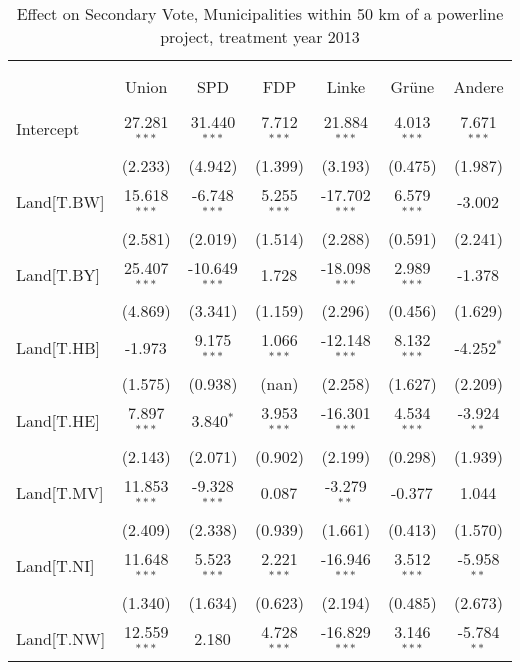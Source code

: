 \begin{table}[!htbp] \centering
  \caption{Effect on Secondary Vote, Municipalities within 50 km of a powerline project, treatment year 2013}
\begin{tabular}{@{\extracolsep{5pt}}lcccccc}
\\[-1.8ex]\hline
\hline \\[-1.8ex]
\\[-1.8ex] & \multicolumn{1}{c}{Union} & \multicolumn{1}{c}{SPD} & \multicolumn{1}{c}{FDP} & \multicolumn{1}{c}{Linke} & \multicolumn{1}{c}{Grüne} & \multicolumn{1}{c}{Andere}  \\
\hline \\[-1.8ex]
 Intercept & 27.281$^{***}$ & 31.440$^{***}$ & 7.712$^{***}$ & 21.884$^{***}$ & 4.013$^{***}$ & 7.671$^{***}$ \\
  & (2.233) & (4.942) & (1.399) & (3.193) & (0.475) & (1.987) \\
 Land[T.BW] & 15.618$^{***}$ & -6.748$^{***}$ & 5.255$^{***}$ & -17.702$^{***}$ & 6.579$^{***}$ & -3.002$^{}$ \\
  & (2.581) & (2.019) & (1.514) & (2.288) & (0.591) & (2.241) \\
 Land[T.BY] & 25.407$^{***}$ & -10.649$^{***}$ & 1.728$^{}$ & -18.098$^{***}$ & 2.989$^{***}$ & -1.378$^{}$ \\
  & (4.869) & (3.341) & (1.159) & (2.296) & (0.456) & (1.629) \\
 Land[T.HB] & -1.973$^{}$ & 9.175$^{***}$ & 1.066$^{***}$ & -12.148$^{***}$ & 8.132$^{***}$ & -4.252$^{*}$ \\
  & (1.575) & (0.938) & (nan) & (2.258) & (1.627) & (2.209) \\
 Land[T.HE] & 7.897$^{***}$ & 3.840$^{*}$ & 3.953$^{***}$ & -16.301$^{***}$ & 4.534$^{***}$ & -3.924$^{**}$ \\
  & (2.143) & (2.071) & (0.902) & (2.199) & (0.298) & (1.939) \\
 Land[T.MV] & 11.853$^{***}$ & -9.328$^{***}$ & 0.087$^{}$ & -3.279$^{**}$ & -0.377$^{}$ & 1.044$^{}$ \\
  & (2.409) & (2.338) & (0.939) & (1.661) & (0.413) & (1.570) \\
 Land[T.NI] & 11.648$^{***}$ & 5.523$^{***}$ & 2.221$^{***}$ & -16.946$^{***}$ & 3.512$^{***}$ & -5.958$^{**}$ \\
  & (1.340) & (1.634) & (0.623) & (2.194) & (0.485) & (2.673) \\
 Land[T.NW] & 12.559$^{***}$ & 2.180$^{}$ & 4.728$^{***}$ & -16.829$^{***}$ & 3.146$^{***}$ & -5.784$^{**}$ \\

\end{tabular}
\end{table}
